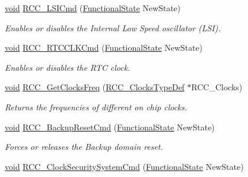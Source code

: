 \begin{DoxyCompactItemize}
\hyperlink{usb__devapi_8h_afabf60e7f57651d6d595a02c75f07cd0}{void} \hyperlink{group___r_c_c___exported___functions_ga81e3ca29fd154ac2019bba6936d6d5ed}{R\+C\+C\+\_\+\+L\+S\+I\+Cmd} (\hyperlink{agilefox_2library_2inc_2stm32f10x__type_8h_ac9a7e9a35d2513ec15c3b537aaa4fba1}{Functional\+State} New\+State)
\begin{DoxyCompactList}\small\item\em Enables or disables the Internal Low Speed oscillator (L\+SI). \end{DoxyCompactList}\item 
\hyperlink{usb__devapi_8h_afabf60e7f57651d6d595a02c75f07cd0}{void} \hyperlink{group___r_c_c___exported___functions_ga9802f84846df2cea8e369234ed13b159}{R\+C\+C\+\_\+\+R\+T\+C\+C\+L\+K\+Cmd} (\hyperlink{agilefox_2library_2inc_2stm32f10x__type_8h_ac9a7e9a35d2513ec15c3b537aaa4fba1}{Functional\+State} New\+State)
\begin{DoxyCompactList}\small\item\em Enables or disables the R\+TC clock. \end{DoxyCompactList}\item 
\hyperlink{usb__devapi_8h_afabf60e7f57651d6d595a02c75f07cd0}{void} \hyperlink{group___r_c_c___exported___functions_ga3e9944fd1ed734275222bbb3e3f29993}{R\+C\+C\+\_\+\+Get\+Clocks\+Freq} (\hyperlink{struct_r_c_c___clocks_type_def}{R\+C\+C\+\_\+\+Clocks\+Type\+Def} $\ast$R\+C\+C\+\_\+\+Clocks)
\begin{DoxyCompactList}\small\item\em Returns the frequencies of different on chip clocks. \end{DoxyCompactList}\item 
\hyperlink{usb__devapi_8h_afabf60e7f57651d6d595a02c75f07cd0}{void} \hyperlink{group___r_c_c___exported___functions_ga636c3b72f35391e67f12a551b15fa54a}{R\+C\+C\+\_\+\+Backup\+Reset\+Cmd} (\hyperlink{agilefox_2library_2inc_2stm32f10x__type_8h_ac9a7e9a35d2513ec15c3b537aaa4fba1}{Functional\+State} New\+State)
\begin{DoxyCompactList}\small\item\em Forces or releases the Backup domain reset. \end{DoxyCompactList}\item 
\hyperlink{usb__devapi_8h_afabf60e7f57651d6d595a02c75f07cd0}{void} \hyperlink{group___r_c_c___exported___functions_ga0ff1fd7b9a8a49cdda11b7d7261c3494}{R\+C\+C\+\_\+\+Clock\+Security\+System\+Cmd} (\hyperlink{agilefox_2library_2inc_2stm32f10x__type_8h_ac9a7e9a35d2513ec15c3b537aaa4fba1}{Functional\+State} New\+State)

\end{DoxyCompactItemize}
